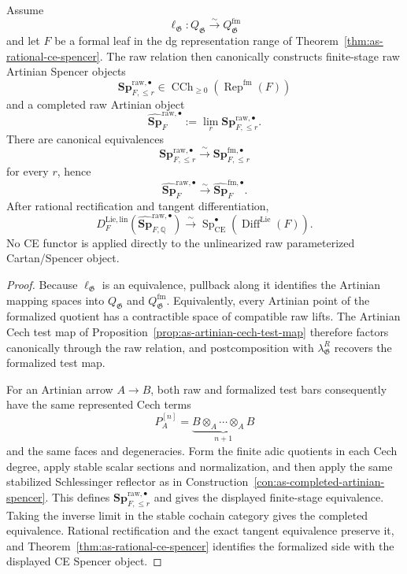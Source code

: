 \begin{corollary}
\label{cor:as-raw-rational-ce-spencer}
Assume
\[
    \ell_{\mathfrak G}:
    Q_{\mathfrak G}\xrightarrow{\sim}Q_{\mathfrak G}^{\mathrm{fm}}
\]
and let $F$ be a formal leaf in the dg representation range of
Theorem~\ref{thm:as-rational-ce-spencer}.  The raw relation then canonically
constructs finite-stage raw Artinian Spencer objects
\[
    \mathbf{Sp}^{\mathrm{raw},\bullet}_{F,\le r}
    \in
    \operatorname{CCh}_{\geq0}
    \left(\operatorname{Rep}^{\mathrm{fm}}(F)\right)
\]
and a completed raw Artinian object
\[
\boxed{
    \widehat{\mathbf{Sp}}_{F}^{\mathrm{raw},\bullet}
    :=
    \lim_r
    \mathbf{Sp}^{\mathrm{raw},\bullet}_{F,\le r}.
}
\]
There are canonical equivalences
\[
\boxed{
    \mathbf{Sp}^{\mathrm{raw},\bullet}_{F,\le r}
    \xrightarrow{\sim}
    \mathbf{Sp}^{\mathrm{fm},\bullet}_{F,\le r}
}
\]
for every $r$, hence
\[
\boxed{
    \widehat{\mathbf{Sp}}_{F}^{\mathrm{raw},\bullet}
    \xrightarrow{\sim}
    \widehat{\mathbf{Sp}}_{F}^{\mathrm{fm},\bullet}.
}
\]
After rational rectification and tangent differentiation,
\[
\boxed{
    D_F^{\mathrm{Lie,lin}}
    \left(
        \widehat{\mathbf{Sp}}_{F,\mathbb Q}^{\mathrm{raw},\bullet}
    \right)
    \xrightarrow{\sim}
    \operatorname{Sp}_{\mathrm{CE}}^\bullet
    \left(\operatorname{Diff}^{\mathrm{Lie}}(F)\right).
}
\]
No CE functor is applied directly to the unlinearized raw parameterized
Cartan/Spencer object.
\end{corollary}

\begin{proof}
Because $\ell_{\mathfrak G}$ is an equivalence, pullback along it identifies
the Artinian mapping spaces into $Q_{\mathfrak G}$ and
$Q_{\mathfrak G}^{\mathrm{fm}}$.  Equivalently, every Artinian point of the
formalized quotient has a contractible space of compatible raw lifts.  The
Artinian Cech test map of
Proposition~\ref{prop:as-artinian-cech-test-map} therefore factors
canonically through the raw relation, and postcomposition with
$\lambda^R_{\mathfrak G}$ recovers the formalized test map.

For an Artinian arrow $A\to B$, both raw and formalized test bars consequently
have the same represented Cech terms
\[
    P_A^{[n]}
    =
    \underbrace{B\otimes_A\cdots\otimes_AB}_{n+1}
\]
and the same faces and degeneracies.  Form the finite adic quotients in each
Cech degree, apply stable scalar sections and normalization, and then apply
the same stabilized Schlessinger reflector as in
Construction~\ref{con:as-completed-artinian-spencer}.  This defines
$\mathbf{Sp}^{\mathrm{raw},\bullet}_{F,\le r}$ and gives the displayed
finite-stage equivalence.  Taking the inverse limit in the stable cochain
category gives the completed equivalence.  Rational rectification and the
exact tangent equivalence preserve it, and
Theorem~\ref{thm:as-rational-ce-spencer} identifies the formalized side with
the displayed CE Spencer object.
\end{proof}

